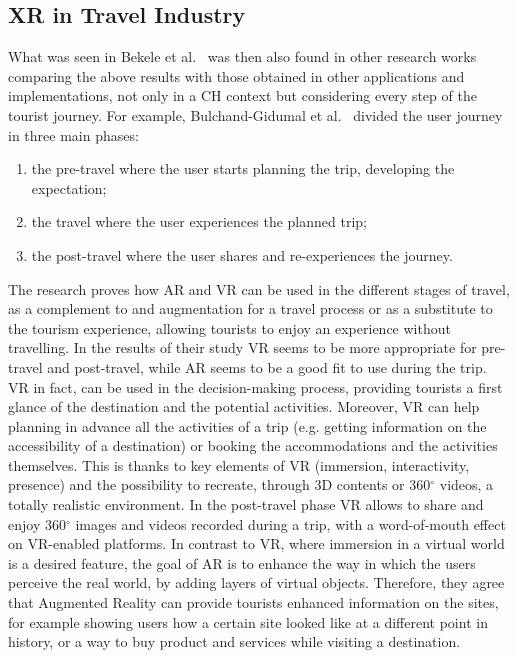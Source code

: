\subsection{XR in Travel Industry}
What was seen in Bekele et al.~\cite{bekele_survey_2018} was then also found in other research works comparing the above results with those obtained in other applications and implementations, not only in a CH context but considering every step of the tourist journey. For example, Bulchand-Gidumal et al.~\cite{bulchand-gidumal_tourists_2020} divided the user journey in three main phases:
\begin{enumerate}
	\item the pre-travel where the user starts planning the trip, developing the expectation;
	\item the travel where the user experiences the planned trip;
	\item the post-travel where the user shares and re-experiences the journey.
\end{enumerate}

The research proves how AR and VR can be used in the different stages of travel, as a complement to and augmentation for a travel process or as a substitute to the tourism experience, allowing tourists to enjoy an experience without travelling. In the results of their study VR seems to be more appropriate for pre-travel and post-travel, while AR seems to be a good fit to use during the trip. VR in fact, can be used in the decision-making process, providing tourists a first glance of the destination and the potential activities. Moreover, VR can help planning in advance all the activities of a trip (e.g. getting information on the accessibility of a destination) or booking the accommodations and the activities themselves. This is thanks to key elements of VR (immersion, interactivity, presence) and the possibility to recreate, through 3D contents or 360$^{\circ}$ videos, a totally realistic environment. 
In the post-travel phase VR allows to share and enjoy 360$^{\circ}$ images and videos recorded during a trip, with a word-of-mouth effect on VR-enabled platforms.
In contrast to VR, where immersion in a virtual world is a desired feature, the goal of AR is to enhance the way in which the users perceive the real world, by adding layers of virtual objects. Therefore, they agree that Augmented Reality can provide tourists enhanced information on the sites, for example showing users how a certain site looked like at a different point in history, or a way to buy product and services while visiting a destination.

